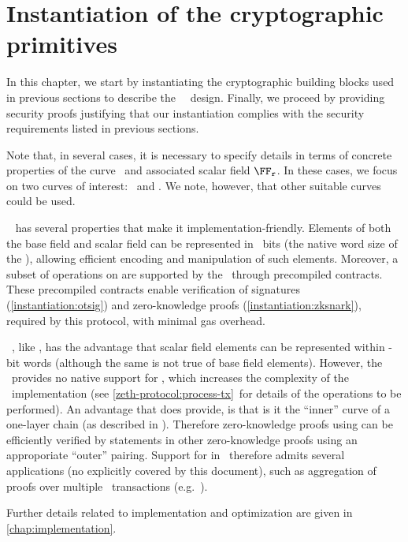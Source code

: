
\chapter{Instantiation of the cryptographic primitives}\label{chap:instantiation}

In this chapter, we start by instantiating the cryptographic building blocks used in previous sections to describe the \zeth~\dapscheme~design. Finally, we proceed by providing security proofs justifying that our instantiation complies with the security requirements listed in previous sections.

Note that, in several cases, it is necessary to specify details in terms of concrete properties of the curve \Curve~and associated scalar field $\FFx{\rCURVE}$. In these cases, we focus on two curves of interest: \BNCurve~and \BLSCurve. We note, however, that other suitable curves could be used.

\BNCurve~\cite{bn-prime} has several properties that make it implementation-friendly. Elements of both the base field and scalar field can be represented in \ethWordLen~bits (the native word size of the \evm), allowing efficient encoding and manipulation of such elements. Moreover, a subset of operations on \BNCurve are supported by the \evm~through precompiled contracts. These precompiled contracts enable verification of signatures (\cref{instantiation:otsig}) and zero-knowledge proofs (\cref{instantiation:zksnark}), required by this protocol, with minimal gas overhead.

\BLSCurve~\cite{bowe18zexe}, like \BNCurve, has the advantage that scalar field elements can be represented within \ethWordLen-bit words (although the same is not true of base field elements). However, the \evm~provides no native support for \BLSCurve, which increases the complexity of the \mixer~implementation (see \cref{zeth-protocol:process-tx}~for details of the operations to be performed). An advantage that \BLSCurve does provide, is that is it the ``inner'' curve of a one-layer chain (as described in \cite{bowe18zexe,housni2020onelayer}). Therefore zero-knowledge proofs using \BLSCurve can be efficiently verified by statements in other zero-knowledge proofs using an approporiate ``outer'' pairing. Support for \BLSCurve in \zeth~therefore admits several applications (no explicitly covered by this document), such as aggregation of proofs over multiple \zeth~transactions (e.g.~\cite{rondelet2020zecale}).

Further details related to implementation and optimization are given in \cref{chap:implementation}.

